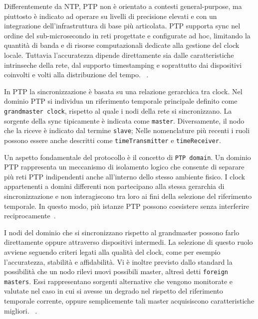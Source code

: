 Differentemente da NTP, PTP non è orientato a contesti general-purpose, ma piuttosto è 
indicato ad operare su livelli di precisione elevati e con un integrazione dell'infrastruttura di base 
più articolata. PTP supporta sync nel ordine del sub-microsecondo in reti progettate e configurate ad hoc, 
limitando la quantità di banda e di risorse computazionali dedicate alla gestione del clock locale.
Tuttavia l'accuratezza dipende direttamente sia dalle caratteristiche intrinseche della rete, dal supporto timestamping
 e soprattutto dai dispositivi coinvolti e volti alla distribuzione del tempo. ~\cite{IEEEStandardPrecision2020}.

\begin{sloppypar}
In PTP la sincronizzazione è basata su una relazione gerarchica tra clock. Nel dominio PTP
 si individua un riferimento temporale principale definito come \texttt{grandmaster clock}, 
 rispetto al quale i nodi della rete si sincronizzano. La sorgente della sync tipicamente è indicata come 
\texttt{master}. Diversamente, il nodo che la riceve è indicato dal termine \texttt{slave};
Nelle nomenclature più recenti i ruoli possono essere anche descritti come \texttt{timeTransmitter} e \texttt{timeReceiver}.  
\end{sloppypar}

Un aspetto fondamentale del protocollo è il concetto di \texttt{PTP domain}. Un
dominio PTP rappresenta un meccanismo di isolamento logico che consente di
separare più reti PTP indipendenti anche all'interno dello stesso ambiente
fisico. I clock appartenenti a domini differenti non partecipano alla stessa gerarchia
di sincronizzazione e non interagiscono tra loro ai fini della selezione del riferimento
temporale. In questo modo, più istanze PTP possono coesistere senza interferire reciprocamente~\cite{IEEEStandardPrecision2020}.

I nodi del dominio che si sincronizzano rispetto al grandmaster possono farlo direttamente oppure attraverso 
dispositivi intermedi.
La selezione di questo ruolo avviene seguendo criteri legati alla qualità del clock, come per esempio 
l'accuratezza, stabilità e affidabilità.
Vi è inoltre previsto dallo standard la possibilità che un nodo rilevi nuovi possibili master, altresì detti
 \texttt{foreign masters}. Essi rappresentano sorgenti alternative che vengono monitorate e valutate nel caso in cui si 
 avesse un degrado nel rispetto del riferimento temporale corrente, oppure semplicemente tali master acquisiscono caratteristiche migliori.
 ~\cite{IEEEStandardPrecision2020}.

